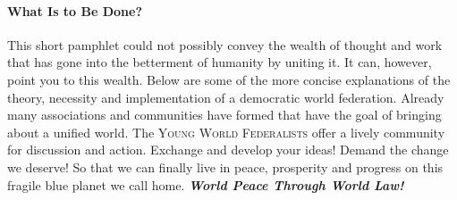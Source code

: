 \documentclass[11pt,a4paper]{article}
\begin{document}
\paragraph{What Is to Be Done?}

This short pamphlet could not possibly convey the wealth of thought and work that has gone into the betterment of humanity by uniting it.
It can, however, point you to this wealth.
Below are some of the more concise explanations of the theory, necessity and implementation of a democratic world federation. Already many associations and communities have formed that have the goal of bringing about a unified world.
The \textsc{Young World Federalists} offer a lively community for discussion and action.
Exchange and develop your ideas!
Demand the change we deserve!
So that we can finally live in peace, prosperity and progress on this fragile blue planet we call home. \hfill \textbf{\textit{World Peace Through World Law!}}

\vspace{11pt}
\hline

\begin{multicols}{2}
\nocite{*}
\begingroup
{}
\setlength\bibitemsep{2pt}
\printbibliography[heading=none]
\endgroup
\end{multicols}
\end{document}
